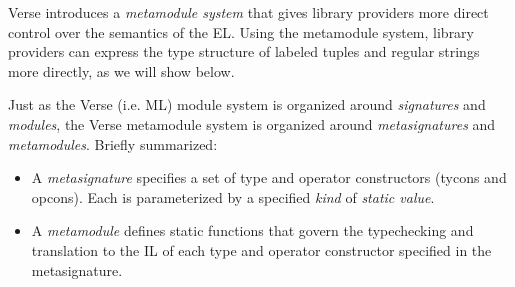 Verse introduces a \emph{metamodule system} that gives library providers more direct control over the semantics of the EL. Using the metamodule system, library providers can express the type structure of labeled tuples and regular strings more directly, as we will show below.

Just as the Verse (i.e. ML) module system is organized around \emph{signatures} and \emph{modules}, the Verse metamodule system is organized around \emph{metasignatures} and \emph{metamodules}. Briefly summarized:
\begin{itemize}
\item A \emph{metasignature} specifies a set of type and operator constructors (tycons and opcons). Each is parameterized by a specified \emph{kind} of \emph{static value}. 
\item A \emph{metamodule}  defines static functions that govern the typechecking and  translation to the IL of each type and operator constructor specified in the  metasignature. 
\end{itemize}
